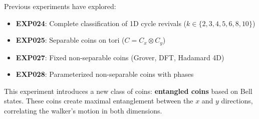 Previous experiments have explored:

\begin{itemize}
    \item \textbf{EXP024}: Complete classification of 1D cycle revivals
          ($k \in \{2,3,4,5,6,8,10\}$)
    \item \textbf{EXP025}: Separable coins on tori
          ($C = C_x \otimes C_y$)
    \item \textbf{EXP027}: Fixed non-separable coins (Grover, DFT,
          Hadamard 4D)
    \item \textbf{EXP028}: Parameterized non-separable coins with phases
\end{itemize}

This experiment introduces a new class of coins: \textbf{entangled
coins} based on Bell states. These coins create maximal entanglement
between the $x$ and $y$ directions, correlating the walker's motion in
both dimensions.
